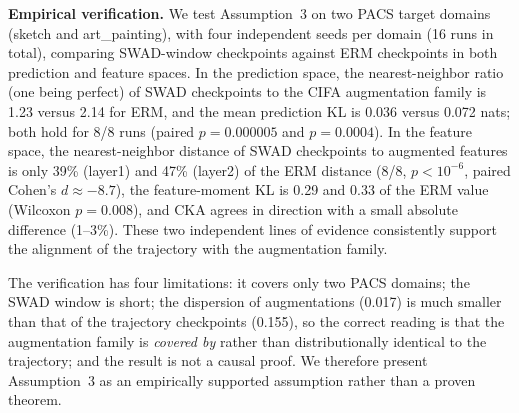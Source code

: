 \documentclass[electronics,article,submit,moreauthors]{Definitions/mdpi}
\begin{document}
\noindent\textbf{Empirical verification.} We test Assumption~3 on two PACS target domains (sketch and art\_painting), with four independent seeds per domain (16 runs in total), comparing SWAD-window checkpoints against ERM checkpoints in both prediction and feature spaces. In the prediction space, the nearest-neighbor ratio (one being perfect) of SWAD checkpoints to the CIFA augmentation family is 1.23 versus 2.14 for ERM, and the mean prediction KL is 0.036 versus 0.072 nats; both hold for 8/8 runs (paired $p=0.000005$ and $p=0.0004$). In the feature space, the nearest-neighbor distance of SWAD checkpoints to augmented features is only 39\% (layer1) and 47\% (layer2) of the ERM distance (8/8, $p<10^{-6}$, paired Cohen's $d\approx-8.7$), the feature-moment KL is 0.29 and 0.33 of the ERM value (Wilcoxon $p=0.008$), and CKA agrees in direction with a small absolute difference (1--3\%). These two independent lines of evidence consistently support the alignment of the trajectory with the augmentation family.

The verification has four limitations: it covers only two PACS domains; the SWAD window is short; the dispersion of augmentations (0.017) is much smaller than that of the trajectory checkpoints (0.155), so the correct reading is that the augmentation family is \emph{covered by} rather than distributionally identical to the trajectory; and the result is not a causal proof. We therefore present Assumption~3 as an empirically supported assumption rather than a proven theorem.
\end{document}
